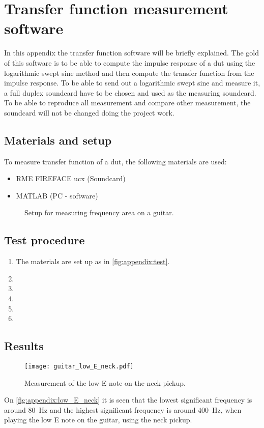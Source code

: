 \chapter*{Transfer function measurement software}
In this appendix the transfer function software will be briefly explained. The gold of this software is to be able to compute the impulse response of a \gls{dut} using the logarithmic swept sine method and then compute the transfer function from the impulse response. To be able to send out a logarithmic swept sine and measure it, a full duplex soundcard have to be chosen and used as the measuring soundcard. To be able to reproduce all measurement and compare other measurement, the soundcard will not be changed doing the project work.

\section*{Materials and setup}
To measure transfer function of a \gls{dut}, the following materials are used:
\begin{itemize}
\item RME FIREFACE ucx (Soundcard)
\item MATLAB (PC - software)
\end{itemize}

\begin{figure}[htbp!]
\centering
\def\svgwidth{\columnwidth}

\caption{Setup for measuring frequency area on a guitar.}
		\label{fig:appendix:test}
\end{figure}

\section*{Test procedure}


\begin{enumerate}
\item The materials are set up as in \autoref{fig:appendix:test}.
\item 
\item  
\item  
\item 
\item 
\end{enumerate}

\section*{Results}

\begin{figure}[htbp!]
	\centering
		\texttt{[image: guitar\_low\_E\_neck.pdf]}
		\caption{Measurement of the low E note on the neck pickup.}
		\label{fig:appendix:low_E_neck}
\end{figure}

On  \autoref{fig:appendix:low_E_neck} it is seen that the lowest significant frequency is around \SI{80}{\hertz} and the highest significant frequency is around \SI{400}{\hertz}, when playing the low E note on the guitar, using the neck pickup.


